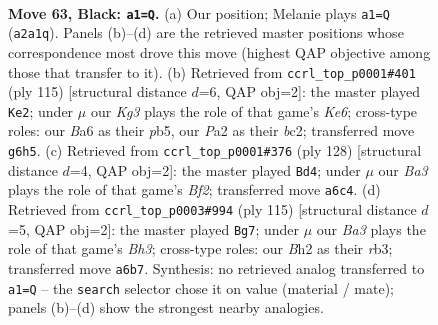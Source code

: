 \documentclass[11pt]{article}
\begin{document}
\clearpage

\begin{figure}[p]\centering
\begin{subfigure}{0.46\textwidth}\centering
\resizebox{\linewidth}{!}{%
\newchessgame
\chessboard[
  setfen={6K1/8/b5k1/6p1/8/8/p6b/8 b - - 5 63},
  showmover=false,
  pgfstyle=straightmove, color=movearrow, markmove={a2-a1}
]}
\caption{}
\end{subfigure}\hfill
\begin{subfigure}{0.46\textwidth}\centering
\resizebox{\linewidth}{!}{%
\newchessgame
\chessboard[
  setfen={8/8/8/1P2K3/8/4k3/2Bp4/7b b - - 1 58},
  showmover=false,
  pgfstyle=straightmove, color=movearrow, markmove={e3-e2}
]}
\caption{}
\end{subfigure}
\\[4pt]
\begin{subfigure}{0.46\textwidth}\centering
\resizebox{\linewidth}{!}{%
\newchessgame
\chessboard[
  setfen={2k5/4P3/P2K2b1/8/8/8/5B2/8 w - - 19 65},
  showmover=false,
  pgfstyle=straightmove, color=movearrow, markmove={f2-d4}
]}
\caption{}
\end{subfigure}\hfill
\begin{subfigure}{0.46\textwidth}\centering
\resizebox{\linewidth}{!}{%
\newchessgame
\chessboard[
  setfen={8/8/4pk1b/8/6K1/1R6/5P2/8 b - - 16 58},
  showmover=false,
  pgfstyle=straightmove, color=movearrow, markmove={h6-g7}
]}
\caption{}
\end{subfigure}
\caption{\textbf{Move 63, Black: \texttt{a1=Q}.} (a) Our position; Melanie plays \texttt{a1=Q} (\texttt{a2a1q}). Panels (b)--(d) are the retrieved master positions whose correspondence most drove this move (highest QAP objective among those that transfer to it). (b) Retrieved from \texttt{ccrl\_top\_p0001\#401} (ply 115) [structural distance $d$=6, QAP obj=2]: the master played \texttt{Ke2}; under $\mu$ our \emph{Kg3} plays the role of that game's \emph{Ke6}; cross-type roles: our \emph{B}a6 as their \emph{p}b5, our \emph{P}a2 as their \emph{b}c2; transferred move \texttt{g6h5}. (c) Retrieved from \texttt{ccrl\_top\_p0001\#376} (ply 128) [structural distance $d$=4, QAP obj=2]: the master played \texttt{Bd4}; under $\mu$ our \emph{Ba3} plays the role of that game's \emph{Bf2}; transferred move \texttt{a6c4}. (d) Retrieved from \texttt{ccrl\_top\_p0003\#994} (ply 115) [structural distance $d$=5, QAP obj=2]: the master played \texttt{Bg7}; under $\mu$ our \emph{Ba3} plays the role of that game's \emph{Bh3}; cross-type roles: our \emph{B}h2 as their \emph{r}b3; transferred move \texttt{a6b7}. Synthesis: no retrieved analog transferred to \texttt{a1=Q} -- the \texttt{search} selector chose it on value (material / mate); panels (b)--(d) show the strongest nearby analogies.}
\label{fig:thought-m125}
\end{figure}
\end{document}
